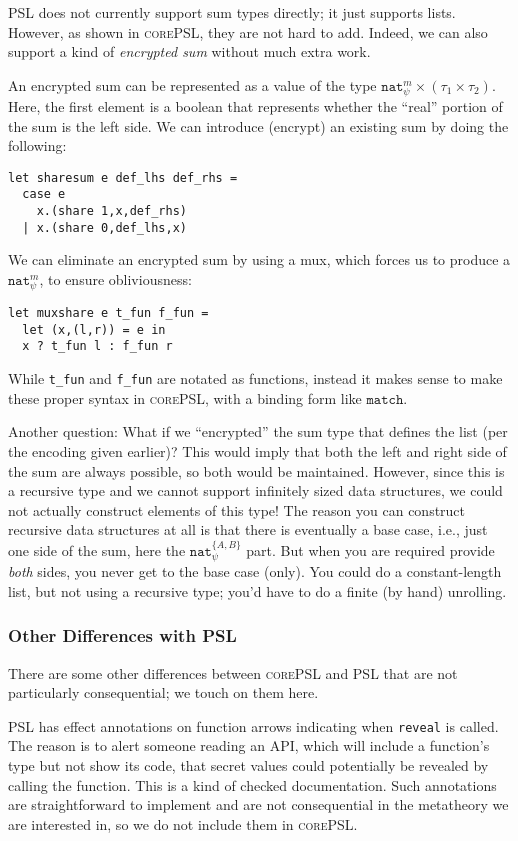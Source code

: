 \documentclass[10pt]{article}
\newcommand{\kw}[1]{\ensuremath{\mathtt{#1}}}
\newcommand{\tnat}{\ensuremath{\mathtt{nat}}}
\newcommand{\tpair}[2]{\ensuremath{{#1} \times {#2}}}
\newcommand{\lang}{\textsc{corePSL}\xspace}
\begin{document}
PSL does not currently support sum types directly; it just supports
lists. However, as shown in \lang, they are not hard to add. Indeed,
we can also support a kind of \emph{encrypted sum} without much extra
work. 

An encrypted sum can be represented as a value of the type
$\tpair{\tnat^m_\psi}{(\tpair{\tau_1}{\tau_2})}$. Here, the first
element is a boolean that represents whether the ``real'' portion of
the sum is the left side. We can introduce (encrypt) an existing sum
by doing the following:
\begin{verbatim}
let sharesum e def_lhs def_rhs =
  case e 
    x.(share 1,x,def_rhs)
  | x.(share 0,def_lhs,x)
\end{verbatim}
We can eliminate an encrypted sum by using a mux, which forces us
to produce a $\tnat^m_\psi$, to ensure obliviousness:
\begin{verbatim}
let muxshare e t_fun f_fun =
  let (x,(l,r)) = e in
  x ? t_fun l : f_fun r
\end{verbatim}
While \verb+t_fun+ and \verb+f_fun+ are notated as functions, instead
it makes sense to make these proper syntax in \lang, with a
binding form like $\kw{match}$.

Another question: What if we ``encrypted'' the sum type that defines
the list (per the encoding given earlier)? This would imply that both the left
and right side of the sum are always possible, so both would be
maintained. However, since this is a recursive type and we cannot
support infinitely sized data structures, we could not actually
construct elements of this type! The reason you can construct
recursive data structures at all is that there is eventually a base
case, i.e., just one side of the sum, here the $\tnat^{\{A,B\}}_\psi$
part. But when you are required provide \emph{both} sides, you never
get to the base case (only). You could do a constant-length list, but
not using a recursive type; you'd have to do a finite (by hand)
unrolling.

\subsubsection{Other Differences with PSL}

There are some other differences between \lang and PSL that are not
particularly consequential; we touch on them here.

PSL has effect annotations on function arrows indicating when
\texttt{reveal} is called. The reason is to alert someone reading an
API, which will include a function's type but not show its code, that secret values could
potentially be revealed by calling the function. This is a kind of
checked documentation. Such annotations are straightforward to
implement and are not consequential in the metatheory we are
interested in, so we do not include them in \lang.
\end{document}
